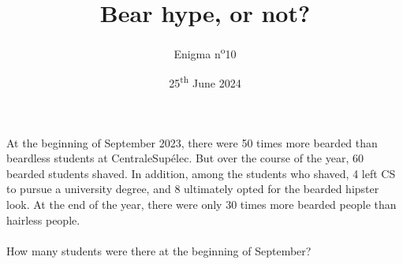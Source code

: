 \documentclass[a4paper, top=10mm]{article}
\title{\textbf{\huge{Bear hype, or not?}}}
\author{Enigma n\textsuperscript{o}10}
\date{25\textsuperscript{th} June 2024}
\begin{document}
	\maketitle
	
	\Large
	At the beginning of September 2023, there were 50 times more bearded than beardless students at CentraleSupélec.
	But over the course of the year, 60 bearded students shaved.
	In addition, among the students who shaved, 4 left CS to pursue a university degree, and 8 ultimately opted for the bearded hipster look.
	At the end of the year, there were only 30 times more bearded people than hairless people.\\
	\\
	How many students were there at the beginning of September?
	
	\vspace{2cm}
	
	\begin{center}
	\end{center}
	
	
\end{document}
